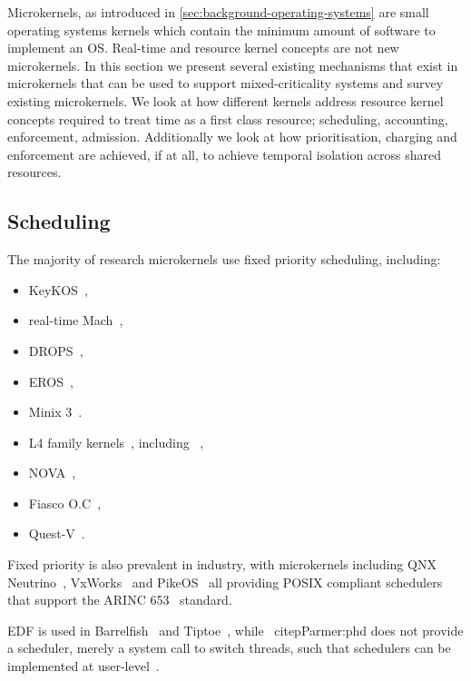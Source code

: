 Microkernels, as introduced in \cref{sec:background-operating-systems} are small operating systems
kernels which contain the minimum amount of software to implement an OS. Real-time and resource
kernel concepts are not
new microkernels. In this section we present several existing mechanisms that exist in microkernels
that can be used to support mixed-criticality systems and survey existing microkernels. We look at
how different kernels address resource kernel concepts required to treat time as a first class
resource; scheduling, accounting, enforcement, admission. Additionally we look at how
prioritisation, charging and enforcement are achieved, if at all, to achieve temporal isolation
across shared resources.

\subsection{Scheduling}

The majority of research microkernels use fixed priority scheduling, including:

\begin{itemize}
    \item KeyKOS~\citep{Bomberger_FFHLS_92},
    \item real-time Mach~\citep{Mercer_RZ_94, Mercer_ST_93},
    \item DROPS~\citep{Haertig_BBHHMRSW_98}, 
    \item EROS~\citep{Shapiro_SF_99},
    \item Minix 3~\citep{Herder_BGHT_06}.
    \item L4 family kernels~\citep{Elphinstone_Heiser_13}, including \selfour~\citep{Klein_EHACDEEKNSTW_09},
    \item NOVA~\citep{Steinberg_Kauer_10},
    \item Fiasco O.C~\citet{Lackorzynski_WVH_12},
    \item Quest-V~\citep{Li_WCM_14}.
\end{itemize}

Fixed priority is also prevalent in industry, with microkernels including QNX
Neutrino~\citep{QNX_10}, VxWorks~\citep{VxWorks_08} and PikeOS~\citep{PikeOS:URL} all providing
\gls{POSIX} compliant schedulers that support the ARINC 653~\citep{ARINC653} standard.  

\gls{EDF} is used in Barrelfish~\citep{Peter_SBBIHR_10} and Tiptoe~\citep{Craciunas_KPRS_09}, while 
\composite~citep{Parmer:phd} does not provide a scheduler, merely a system call to switch threads,
such that schedulers can be implemented at user-level~\citep{Parmer_West_11}.

